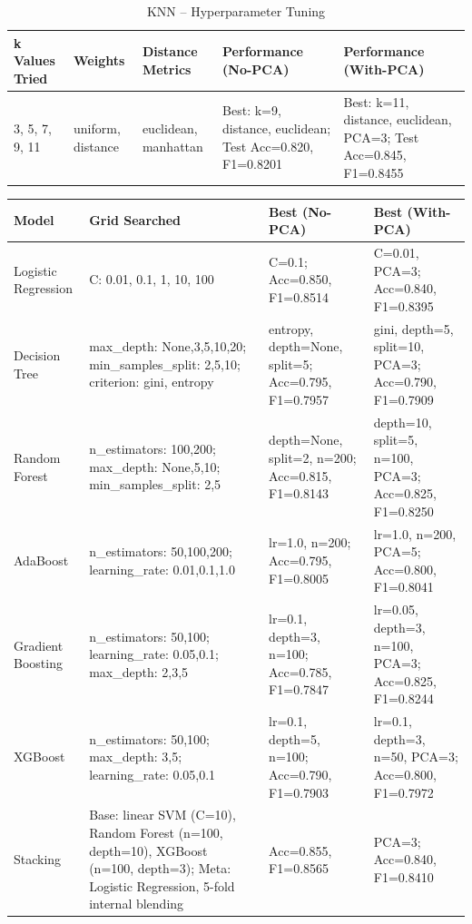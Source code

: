 \documentclass[12pt,a4paper]{article}
\begin{document}
\begin{table}[H]
\centering
\caption{KNN -- Hyperparameter Tuning}
\begin{tabular}{p{2.3cm}p{2.3cm}p{2.6cm}p{3cm}p{3cm}}
\toprule
k Values Tried & Weights & Distance Metrics & Performance (No-PCA) & Performance (With-PCA) \\
\midrule
3, 5, 7, 9, 11 & uniform, distance & euclidean, manhattan & Best: k=9, distance, euclidean; Test Acc=0.820, F1=0.8201 & Best: k=11, distance, euclidean, PCA=3; Test Acc=0.845, F1=0.8455 \\
\bottomrule
\end{tabular}
\end{table}

\begin{table}[H]
\centering
\caption{Remaining Models -- Hyperparameter Grids and Best Settings}
\begin{longtable}{p{3cm}p{5.3cm}p{3.1cm}p{3.1cm}}
\toprule
Model & Grid Searched & Best (No-PCA) & Best (With-PCA) \\
\midrule
Logistic Regression & C: 0.01, 0.1, 1, 10, 100 & C=0.1; Acc=0.850, F1=0.8514 & C=0.01, PCA=3; Acc=0.840, F1=0.8395 \\
Decision Tree & max\_depth: None,3,5,10,20; min\_samples\_split: 2,5,10; criterion: gini, entropy & entropy, depth=None, split=5; Acc=0.795, F1=0.7957 & gini, depth=5, split=10, PCA=3; Acc=0.790, F1=0.7909 \\
Random Forest & n\_estimators: 100,200; max\_depth: None,5,10; min\_samples\_split: 2,5 & depth=None, split=2, n=200; Acc=0.815, F1=0.8143 & depth=10, split=5, n=100, PCA=3; Acc=0.825, F1=0.8250 \\
AdaBoost & n\_estimators: 50,100,200; learning\_rate: 0.01,0.1,1.0 & lr=1.0, n=200; Acc=0.795, F1=0.8005 & lr=1.0, n=200, PCA=5; Acc=0.800, F1=0.8041 \\
Gradient Boosting & n\_estimators: 50,100; learning\_rate: 0.05,0.1; max\_depth: 2,3,5 & lr=0.1, depth=3, n=100; Acc=0.785, F1=0.7847 & lr=0.05, depth=3, n=100, PCA=3; Acc=0.825, F1=0.8244 \\
XGBoost & n\_estimators: 50,100; max\_depth: 3,5; learning\_rate: 0.05,0.1 & lr=0.1, depth=5, n=100; Acc=0.790, F1=0.7903 & lr=0.1, depth=3, n=50, PCA=3; Acc=0.800, F1=0.7972 \\
Stacking & Base: linear SVM (C=10), Random Forest (n=100, depth=10), XGBoost (n=100, depth=3); Meta: Logistic Regression, 5-fold internal blending & Acc=0.855, F1=0.8565 & PCA=3; Acc=0.840, F1=0.8410 \\
\bottomrule
\end{longtable}
\end{table}
\end{document}
